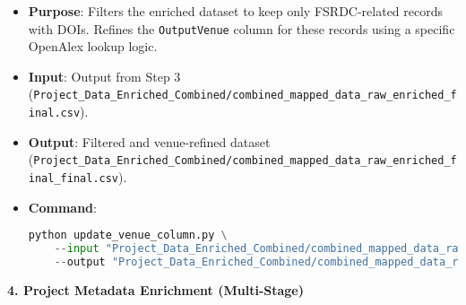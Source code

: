 \documentclass[12pt]{article}
\begin{document}
\begin{itemize}
\item
  \textbf{Purpose}: Filters the enriched dataset to keep only
  FSRDC-related records with DOIs. Refines the \texttt{OutputVenue}
  column for these records using a specific OpenAlex lookup logic.
\item
  \textbf{Input}: Output from Step 3
  (\texttt{Project\_Data\_Enriched\_Combined/combined\_mapped\_data\_raw\_enriched\_final.csv}).
\item
  \textbf{Output}: Filtered and venue-refined dataset
  (\texttt{Project\_Data\_Enriched\_Combined/combined\_mapped\_data\_raw\_enriched\_final\_final.csv}).
\item
  \textbf{Command}:

\begin{lstlisting}[language=Python]
python update_venue_column.py \
    --input "Project_Data_Enriched_Combined/combined_mapped_data_raw_enriched_final.csv" \
    --output "Project_Data_Enriched_Combined/combined_mapped_data_raw_enriched_final_final.csv"
\end{lstlisting}
\end{itemize}

\textbf{4. Project Metadata Enrichment (Multi-Stage)}
\end{document}
